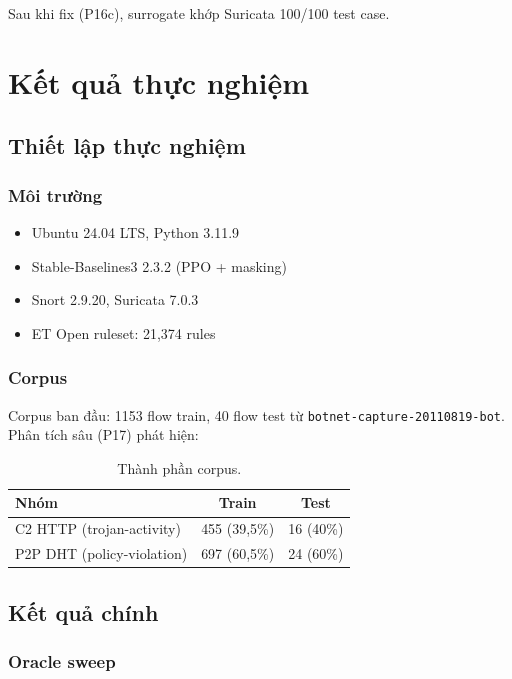\documentclass[12pt, a4paper, openany]{book}
\begin{document}
Sau khi fix (P16c), surrogate khớp Suricata 100/100 test case.

\chapter{Kết quả thực nghiệm}

\section{Thiết lập thực nghiệm}

\subsection{Môi trường}

\begin{itemize}
    \item Ubuntu 24.04 LTS, Python 3.11.9
    \item Stable-Baselines3 2.3.2 (PPO + masking)
    \item Snort 2.9.20, Suricata 7.0.3
    \item ET Open ruleset: 21,374 rules
\end{itemize}

\subsection{Corpus}

Corpus ban đầu: 1153 flow train, 40 flow test từ \texttt{botnet-capture-20110819-bot}. Phân tích sâu (P17) phát hiện:

\begin{table}[htbp]
\centering
\caption{Thành phần corpus.}
\begin{tabular}{lcc}
\toprule
Nhóm & Train & Test \\
\midrule
C2 HTTP (trojan-activity) & 455 (39,5\%) & 16 (40\%) \\
P2P DHT (policy-violation) & 697 (60,5\%) & 24 (60\%) \\
\bottomrule
\end{tabular}
\end{table}

\section{Kết quả chính}

\subsection{Oracle sweep}
\end{document}

